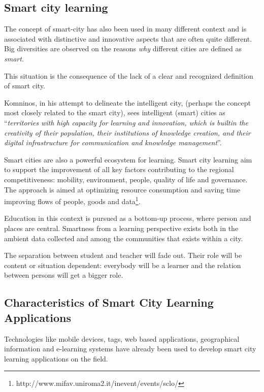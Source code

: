 \subsection{Smart city learning}
The concept of smart-city has also been used in many different context and is associated with distinctive and innovative aspects that are often quite different. Big diversities are observed on the reasons \textit{why} different cities are defined as \textit{smart}.

This situation is the consequence of the lack of a clear and recognized definition of smart city.

Komninos\cite{komninos_intelligent_2002}, in his attempt to delineate the intelligent city, (perhaps the concept most closely related to the smart city), sees intelligent (smart) cities as ``\textit{territories with high capacity for learning and innovation, which is built\textendash in the creativity of their population, their institutions of knowledge creation, and their digital infrastructure for communication and knowledge management}''.

Smart cities are also a powerful ecosystem for learning. Smart city learning aim to support the improvement of all key factors contributing to the regional competitiveness: mobility, environment, people, quality of life and governance. The approach is aimed at optimizing resource consumption and saving time improving flows of people, goods and data\footnote{http://www.mifav.uniroma2.it/inevent/events/sclo/}.

Education in this context is pursued as a bottom-up process, where person and places are central. Smartness from a learning perspective exists both in the ambient data collected and among the communities that exists within a city.

The separation between student and teacher will fade out. Their role will be content or situation dependent: everybody will be a learner and the relation between persons will get a bigger role.


\subsection{Characteristics of Smart City Learning Applications}


Technologies like mobile devices, tags, web based applications, geographical information and e-learning systems have already been used to develop smart city learning applications on the field\cite{perez-sanagustin_multichannel_2013}\cite{delfatto_geographic_2013}.

